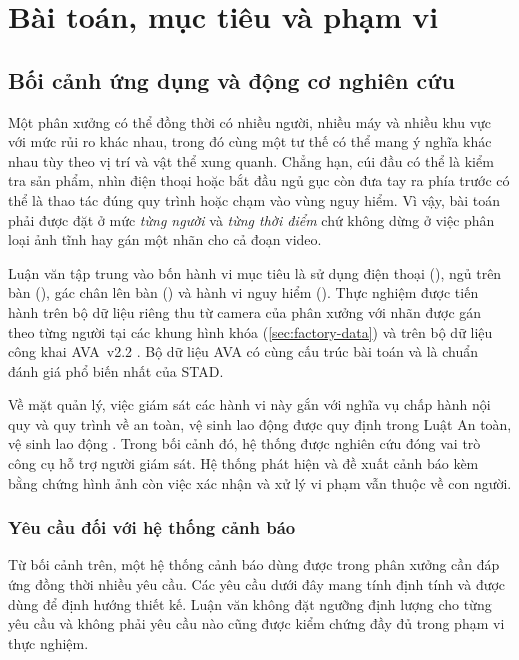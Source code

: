 \chapter{Bài toán, mục tiêu và phạm vi}
\label{ch:problem}

\section{Bối cảnh ứng dụng và động cơ nghiên cứu}
\label{sec:context}

Một phân xưởng có thể đồng thời có nhiều người, nhiều máy và nhiều khu vực với mức rủi ro khác nhau, trong đó cùng một tư thế có thể mang ý nghĩa khác nhau tùy theo vị trí và vật thể xung quanh. Chẳng hạn, cúi đầu có thể là kiểm tra sản phẩm, nhìn điện thoại hoặc bắt đầu ngủ gục còn đưa tay ra phía trước có thể là thao tác đúng quy trình hoặc chạm vào vùng nguy hiểm. Vì vậy, bài toán phải được đặt ở mức \emph{từng người} và \emph{từng thời điểm} chứ không dừng ở việc phân loại ảnh tĩnh hay gán một nhãn cho cả đoạn video.

Luận văn tập trung vào bốn hành vi mục tiêu là sử dụng điện thoại (), ngủ trên bàn (), gác chân lên bàn () và hành vi nguy hiểm (). Thực nghiệm được tiến hành trên bộ dữ liệu riêng thu từ camera của phân xưởng với nhãn được gán theo từng người tại các khung hình khóa (\cref{sec:factory-data}) và trên bộ dữ liệu công khai AVA~v2.2 \cite{gu2018ava}. Bộ dữ liệu AVA có cùng cấu trúc bài toán và là chuẩn đánh giá phổ biến nhất của STAD.

Về mặt quản lý, việc giám sát các hành vi này gắn với nghĩa vụ chấp hành nội quy và quy trình về an toàn, vệ sinh lao động được quy định trong Luật An toàn, vệ sinh lao động \cite{luat2015atvsld}. Trong bối cảnh đó, hệ thống được nghiên cứu đóng vai trò công cụ hỗ trợ người giám sát. Hệ thống phát hiện và đề xuất cảnh báo kèm bằng chứng hình ảnh còn việc xác nhận và xử lý vi phạm vẫn thuộc về con người.

\subsection{Yêu cầu đối với hệ thống cảnh báo}
\label{sec:requirements}

Từ bối cảnh trên, một hệ thống cảnh báo dùng được trong phân xưởng cần đáp ứng đồng thời nhiều yêu cầu. Các yêu cầu dưới đây mang tính định tính và được dùng để định hướng thiết kế. Luận văn không đặt ngưỡng định lượng cho từng yêu cầu và không phải yêu cầu nào cũng được kiểm chứng đầy đủ trong phạm vi thực nghiệm.

